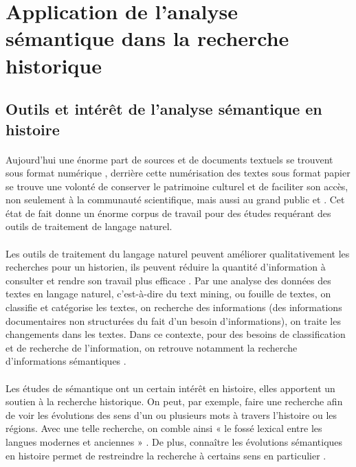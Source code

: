 \documentclass{article}
\begin{document}
\section{Application de l'analyse sémantique dans la recherche historique}
\subsection{Outils et intérêt de l'analyse sémantique en histoire}
\paragraph{}
Aujourd’hui une énorme part de sources et de documents textuels se trouvent sous format numérique \cite[p. 135]{glazkova2017automatic}, derrière cette numérisation des textes sous format papier se trouve une volonté de conserver le patrimoine culturel et de faciliter son accès, non seulement à la communauté scientifique, mais aussi au grand public \cite[p. 135]{glazkova2017automatic} et \cite[p. 1]{liebeskind2020deep}. Cet état de fait donne un énorme corpus de travail pour des études requérant des outils de traitement de langage naturel. 
\paragraph{}
Les outils de traitement du langage naturel peuvent améliorer qualitativement les recherches pour un historien, ils peuvent réduire la quantité d’information à consulter et rendre son travail plus efficace \cite[p. 135]{glazkova2017automatic}. Par une analyse des données des textes en langage naturel, c’est-à-dire du text mining, ou fouille de textes, on classifie et catégorise les textes, on recherche des informations (des informations documentaires non structurées du fait d’un besoin d’informations), on traite les changements dans les textes. Dans ce contexte, pour des besoins de classification et de recherche de l’information, on retrouve notamment la recherche d’informations sémantiques \cite[p. 136]{glazkova2017automatic}. 
\paragraph{}
Les études de sémantique ont un certain intérêt en histoire, elles apportent un soutien à la recherche historique. On peut, par exemple, faire une recherche afin de voir les évolutions des sens d’un ou plusieurs mots à travers l’histoire ou les régions. Avec une telle recherche, on comble ainsi « le fossé lexical entre les langues modernes et anciennes » \cite[p. 1]{liebeskind2020deep}. De plus, connaître les évolutions sémantiques en histoire permet de restreindre la recherche à certains sens en particulier \cite[p. 1]{perrone2019gasc}. 
\end{document}

